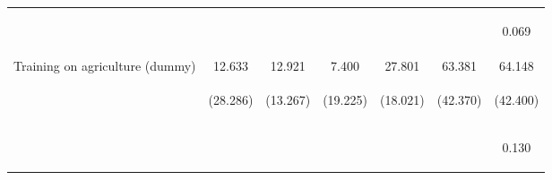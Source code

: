 \begin{center}
\begin{tabular}{lcccccc}
\vspace{4pt} & \begin{footnotesize}[0.163]\end{footnotesize} & \begin{footnotesize}[0.537]\end{footnotesize} & \begin{footnotesize}[0.042]\end{footnotesize} & \begin{footnotesize}[0.587]\end{footnotesize} & \begin{footnotesize}[0.055]\end{footnotesize} & \begin{footnotesize}0.069\end{footnotesize} \\
Training on agriculture (dummy) & 12.633 & 12.921 & 7.400 & 27.801 & 63.381 & 64.148 \\
 & \begin{footnotesize}(28.286)\end{footnotesize} & \begin{footnotesize}(13.267)\end{footnotesize} & \begin{footnotesize}(19.225)\end{footnotesize} & \begin{footnotesize}(18.021)\end{footnotesize} & \begin{footnotesize}(42.370)\end{footnotesize} & \begin{footnotesize}(42.400)\end{footnotesize} \\
\vspace{4pt} & \begin{footnotesize}[0.655]\end{footnotesize} & \begin{footnotesize}[0.330]\end{footnotesize} & \begin{footnotesize}[0.700]\end{footnotesize} & \begin{footnotesize}[0.123]\end{footnotesize} & \begin{footnotesize}[0.135]\end{footnotesize} & \begin{footnotesize}0.130\end{footnotesize} \\

\end{tabular}
\end{center}
